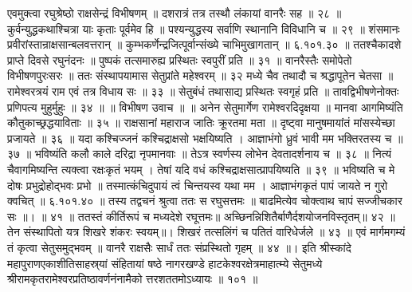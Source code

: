 एवमुक्त्वा रघुश्रेष्ठो राक्षसेन्द्रं विभीषणम् ॥
दशरात्रं तत्र तस्थौ लंकायां वानरैः सह ॥ २८ ॥
कुर्वन्युद्धकथाश्चित्रा याः कृताः पूर्वमेव हि ॥
पश्यन्युद्धस्य सर्वाणि स्थानानि विविधानि च ॥ २९ ॥
शंसमानः प्रवीरांस्तान्राक्षसान्बलवत्तरान् ॥
कुम्भकर्णेन्द्रजित्पूर्वान्संख्ये चाभिमुखागतान् ॥ ६.१०१.३० ॥
ततश्चैकादशे प्राप्ते दिवसे रघुनंदनः ॥
पुष्पकं तत्समारुह्य प्रस्थितः स्वपुरीं प्रति ॥ ३१ ॥
वानरैस्तैः समोपेतो विभीषणपुरःसरः ॥
ततः संस्थापयामास सेतुप्रांते महेश्वरम् ॥ ३२
मध्ये चैव तथादौ च श्रद्धापूतेन चेतसा ॥
रामेश्वरत्रयं राम एवं तत्र विधाय सः ॥ ३३ ॥
सेतुबंधं तथासाद्य प्रस्थितः स्वगृहं प्रति ॥
तावद्विभीषणेनोक्तः प्रणिपत्य मुहुर्मुहुः ॥ ३४ ॥
॥ विभीषण उवाच ॥ ॥
अनेन सेतुमार्गेण रामेश्वरदिदृक्षया ॥
मानवा आगमिष्यंति कौतुकाच्छ्रद्धयाविताः ॥ ३५ ॥
राक्षसानां महाराज जातिः क्रूरतमा मता ॥
दृष्ट्वा मानुषमायांतं मांसस्येच्छा प्रजायते ॥ ३६ ॥
यदा कश्चिज्जनं कश्चिद्राक्षसो भक्षयिष्यति ।
आज्ञाभंगो ध्रुवं भावी मम भक्तिरतस्य च ॥ ३७ ॥
भविष्यंति कलौ काले दरिद्रा नृपमानवाः ॥
तेऽत्र स्वर्णस्य लोभेन देवतादर्शनाय च ॥ ३८ ॥
नित्यं चैवागमिष्यन्ति त्यक्त्वा रक्षःकृतं भयम् ।
तेषां यदि वधं कश्चिद्राक्षसात्प्रापयिष्यति ॥ ३९ ॥
भविष्यति च मे दोषः प्रभुद्रोहोद्भवः प्रभो ॥
तस्मात्कंचिदुपायं त्वं चिन्तयस्व यथा मम ।
आज्ञाभंगकृतं पापं जायते न गुरो क्वचित् ॥ ६.१०१.४० ॥
तस्य तद्वचनं श्रुत्वा ततः स रघुसत्तमः ॥
बाढमित्येव चोक्त्वाथ चापं सज्जीचकार सः ॥। ॥ ४१ ॥
ततस्तं कीर्तिरूपं च मध्यदेशे रघूत्तमः॥
अच्छिनन्निशितैर्बाणैर्दशयोजनविस्तृतम्॥ ४२ ॥
तेन संस्थापितो यत्र शिखरे शंकरः स्वयम्॥।
शिखरं तत्सलिंगं च पतितं वारिधेर्जले ॥ ४३ ॥
एवं मार्गमगम्यं तं कृत्वा सेतुसमुद्भवम् ॥
वानरै राक्षसैः सार्धं ततः संप्रस्थितो गृहम् ॥ ४४ ॥।
इति श्रीस्कांदे महापुराणएकाशीतिसाहस्र्यां संहितायां षष्ठे नागरखण्डे हाटकेश्वरक्षेत्रमाहात्म्ये सेतुमध्ये श्रीरामकृतरामेश्वरप्रतिष्ठावर्णनंनामैको त्तरशततमोऽध्यायः ॥ १०१ ॥

